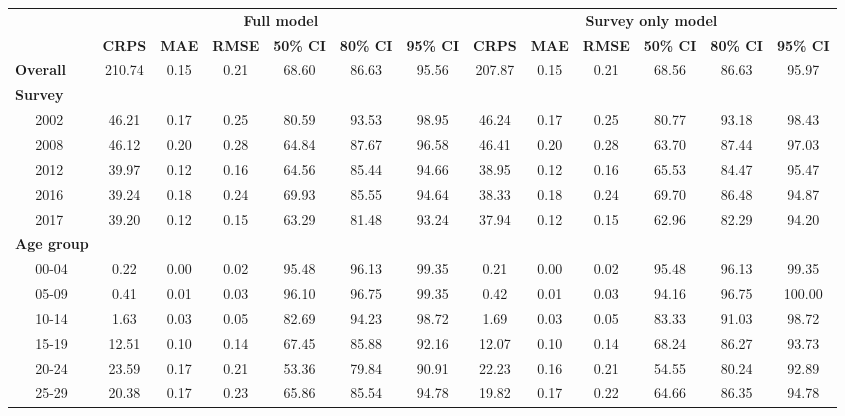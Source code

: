 \documentclass{article}
\begin{document}
\begin{appendix}
\begin{landscape}
{
\begin{table}[H]
\linespread{1}
\footnotesize
    \centering
    \begin{tabular}{ll ccc ccc ccc ccc}
      \hline
       & & \multicolumn{6}{c}{\textbf{Full model}} & \multicolumn{6}{c}{\textbf{Survey only  model}}\\
      \cmidrule(lr){3-8}
      \cmidrule(lr){9-14}
       & & {\bf CRPS} & {\bf MAE} & {\bf RMSE} & {\bf 50\% CI} & {\bf 80\% CI} & {\bf 95\% CI} & {\bf CRPS} & {\bf MAE} & {\bf RMSE} & {\bf 50\% CI} & {\bf 80\% CI} & {\bf 95\% CI} \\[1pt]
      \hline
    \multicolumn{2}{l}{\textbf{Overall}}  & 210.74 & 0.15 & 0.21 & 68.60 & 86.63 & 95.56 & 207.87 & 0.15 & 0.21 & 68.56 & 86.63 &  95.97 \\[5pt] 
    \multicolumn{2}{l}{\textbf{Survey}} \\
    & 2002 &  46.21 & 0.17 & 0.25 & 80.59 & 93.53 & 98.95 &  46.24 & 0.17 & 0.25 & 80.77 & 93.18 &  98.43 \\ 
    & 2008 &  46.12 & 0.20 & 0.28 & 64.84 & 87.67 & 96.58 &  46.41 & 0.20 & 0.28 & 63.70 & 87.44 &  97.03 \\ 
    & 2012 &  39.97 & 0.12 & 0.16 & 64.56 & 85.44 & 94.66 &  38.95 & 0.12 & 0.16 & 65.53 & 84.47 &  95.47 \\ 
    & 2016 &  39.24 & 0.18 & 0.24 & 69.93 & 85.55 & 94.64 &  38.33 & 0.18 & 0.24 & 69.70 & 86.48 &  94.87 \\ 
    & 2017 &  39.20 & 0.12 & 0.15 & 63.29 & 81.48 & 93.24 &  37.94 & 0.12 & 0.15 & 62.96 & 82.29 &  94.20 \\[5pt]
    \multicolumn{2}{l}{\textbf{Age group}} \\
    & 00-04 &   0.22 & 0.00 & 0.02 & 95.48 & 96.13 & 99.35 &   0.21 & 0.00 & 0.02 & 95.48 & 96.13 &  99.35 \\ 
    & 05-09 &   0.41 & 0.01 & 0.03 & 96.10 & 96.75 & 99.35 &   0.42 & 0.01 & 0.03 & 94.16 & 96.75 & 100.00 \\ 
    & 10-14 &   1.63 & 0.03 & 0.05 & 82.69 & 94.23 & 98.72 &   1.69 & 0.03 & 0.05 & 83.33 & 91.03 &  98.72 \\ 
    & 15-19 &  12.51 & 0.10 & 0.14 & 67.45 & 85.88 & 92.16 &  12.07 & 0.10 & 0.14 & 68.24 & 86.27 &  93.73 \\ 
    & 20-24 &  23.59 & 0.17 & 0.21 & 53.36 & 79.84 & 90.91 &  22.23 & 0.16 & 0.21 & 54.55 & 80.24 &  92.89 \\ 
    & 25-29 &  20.38 & 0.17 & 0.23 & 65.86 & 85.54 & 94.78 &  19.82 & 0.17 & 0.22 & 64.66 & 86.35 &  94.78 \\ 

\end{tabular}
\end{table}}
\end{landscape}
\end{appendix}
\end{document}
